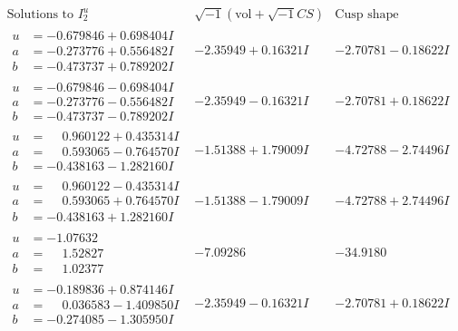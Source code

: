 \documentclass[1p]{elsarticle_modified}
\theoremstyle{definition}
\newcommand{\I}{\sqrt{-1}}
\begin{document}
$$\begin{array}{c|c|c}  
\text{Solutions to }I^u_{2}& \I (\text{vol} + \sqrt{-1}CS) & \text{Cusp shape}\\
 \hline 
\begin{aligned}
u &= -0.679846 + 0.698404 I \\
a &= -0.273776 + 0.556482 I \\
b &= -0.473737 + 0.789202 I\end{aligned}
 & -2.35949 + 0.16321 I & -2.70781 - 0.18622 I \\ \hline\begin{aligned}
u &= -0.679846 - 0.698404 I \\
a &= -0.273776 - 0.556482 I \\
b &= -0.473737 - 0.789202 I\end{aligned}
 & -2.35949 - 0.16321 I & -2.70781 + 0.18622 I \\ \hline\begin{aligned}
u &= \phantom{-}0.960122 + 0.435314 I \\
a &= \phantom{-}0.593065 - 0.764570 I \\
b &= -0.438163 - 1.282160 I\end{aligned}
 & -1.51388 + 1.79009 I & -4.72788 - 2.74496 I \\ \hline\begin{aligned}
u &= \phantom{-}0.960122 - 0.435314 I \\
a &= \phantom{-}0.593065 + 0.764570 I \\
b &= -0.438163 + 1.282160 I\end{aligned}
 & -1.51388 - 1.79009 I & -4.72788 + 2.74496 I \\ \hline\begin{aligned}
u &= -1.07632\phantom{ +0.000000I} \\
a &= \phantom{-}1.52827\phantom{ +0.000000I} \\
b &= \phantom{-}1.02377\phantom{ +0.000000I}\end{aligned}
 & -7.09286\phantom{ +0.000000I} & -34.9180\phantom{ +0.000000I} \\ \hline\begin{aligned}
u &= -0.189836 + 0.874146 I \\
a &= \phantom{-}0.036583 - 1.409850 I \\
b &= -0.274085 - 1.305950 I\end{aligned}
 & -2.35949 - 0.16321 I & -2.70781 + 0.18622 I \\ \hline\begin{aligned}

\end{aligned}
\end{array}$$
\end{document}
